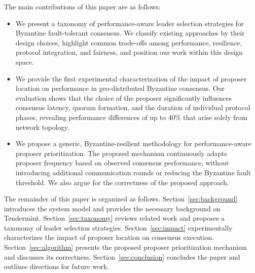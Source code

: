 The main contributions of this paper are as follows: 
\begin{itemize}
\item We present a taxonomy of performance-aware leader selection strategies for Byzantine fault-tolerant consensus. 
We classify existing approaches by their design choices, highlight common trade-offs among performance, resilience, protocol integration, and fairness, and position our work within this design space. 
\item We provide the first experimental characterization of the impact of proposer location on performance in geo-distributed Byzantine consensus. 
Our evaluation shows that the choice of the proposer significantly influences consensus latency, quorum formation, and the duration of individual protocol phases, revealing performance differences of up to 40\% that arise solely from network topology. 
\item We propose a generic, Byzantine-resilient methodology for performance-aware proposer prioritization. 
The proposed mechanism continuously adapts proposer frequency based on observed consensus performance, without introducing additional communication rounds or reducing the Byzantine fault threshold. We also argue for the correctness of the proposed approach. 
\end{itemize} 

The remainder of this paper is organized as follows. 
Section~\ref{sec:background} introduces the system model and provides the necessary background on Tendermint.
Section~\ref{sec:taxonomy} reviews related work and proposes a taxonomy of leader selection strategies. 
Section~\ref{sec:impact} experimentally characterizes the impact of proposer location on consensus execution. 
Section~\ref{sec:algorithm} presents the proposed proposer prioritization mechanism and discusses its correctness.
Section~\ref{sec:conclusion} concludes the paper and outlines directions for future work.


